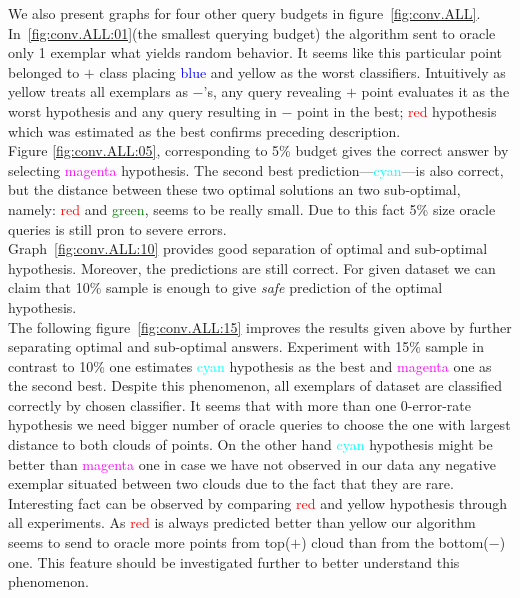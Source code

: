 \documentclass[12pt, a4paper, pdflatex, leqno]{report}
\begin{document}
We also present graphs for four other query budgets in figure~\ref{fig:conv.ALL}. In~\ref{fig:conv.ALL:01}(the smallest querying budget) the algorithm sent to oracle only 1 exemplar what yields random behavior. It seems like this particular point belonged to $+$ class placing \textcolor{blue}{blue} and \textcolor{Dandelion}{yellow} as the worst classifiers. Intuitively as \textcolor{Dandelion}{yellow} treats all exemplars as $-$'s, any query revealing $+$ point evaluates it as the worst hypothesis and any query resulting in $-$ point in the best; \textcolor{red}{red} hypothesis which was estimated as the best confirms preceding description.\\
Figure \ref{fig:conv.ALL:05}, corresponding to 5\% budget gives the correct answer by selecting \textcolor{magenta}{magenta} hypothesis. The second best prediction---\textcolor{cyan}{cyan}---is also correct, but the distance between these two optimal solutions an two sub-optimal, namely: \textcolor{red}{red} and \textcolor{green}{green}, seems to be really small. Due to this fact 5\% size oracle queries is still pron to severe errors.\\
Graph~\ref{fig:conv.ALL:10} provides good separation of optimal and sub-optimal hypothesis. Moreover, the predictions are still correct. For given dataset we can claim that 10\% sample is enough to give \emph{safe} prediction of the optimal hypothesis.\\
The following figure~\ref{fig:conv.ALL:15} improves the results given above by further separating optimal and sub-optimal answers. Experiment with 15\% sample in contrast to 10\% one estimates \textcolor{cyan}{cyan} hypothesis as the best and \textcolor{magenta}{magenta} one as the second best. Despite this phenomenon, all exemplars of dataset are classified correctly by chosen classifier. It seems that with more than one 0-error-rate hypothesis we need bigger number of oracle queries to choose the one with largest distance to both clouds of points. On the other hand \textcolor{cyan}{cyan} hypothesis might be better than \textcolor{magenta}{magenta} one in case we have not observed in our data any negative exemplar situated between two clouds due to the fact that they are rare.\\

Interesting fact can be observed by comparing \textcolor{red}{red} and \textcolor{Dandelion}{yellow} hypothesis through all experiments. As \textcolor{red}{red} is always predicted better than \textcolor{Dandelion}{yellow} our algorithm seems to send to oracle more points from top($+$) cloud than from the bottom($-$) one. This feature should be investigated further to better understand this phenomenon.\\
\end{document}
